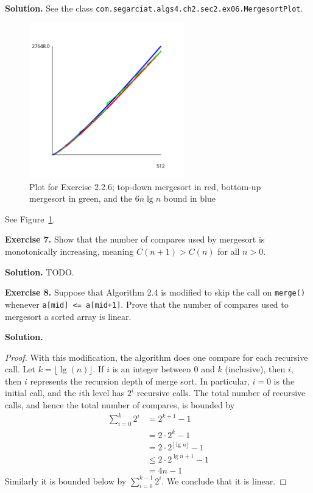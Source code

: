 \documentclass[12pt, a4paper]{article}
\newenvironment{ex}[2][Exercise]
{\par\medskip\noindent \textbf{#1 #2.}}
{\medskip}
\newenvironment{sol}[1][Solution]
{\par\medskip\noindent \textbf{#1.} }
{\medskip}
\begin{document}
	\begin{sol}
		See the class \texttt{com.segarciat.algs4.ch2.sec2.ex06.MergesortPlot}.
		\begin{figure}
			\centering
			\includegraphics[width=0.6\textwidth]{mergesort-array-access-cost-plot}
			\caption{Plot for Exercise 2.2.6; top-down mergesort in red, bottom-up mergesort in green,
			and the $6n\lg n$ bound in blue}
			\label{ex:6}
		\end{figure}
		See Figure~\ref{ex:6}.
	\end{sol}
	\begin{ex}{7}
		Show that the number of compares used by mergesort is monotonically increasing,
		meaning $C(n+1)>C(n)$ for all $n>0$.
	\end{ex}
	\begin{sol}
		TODO.
	\end{sol}
	\begin{ex}{8}
		Suppose that Algorithm 2.4 is modified to skip the call on \texttt{merge()} whenever
		\texttt{a[mid] <= a[mid+1]}. Prove that the number of compares used to mergesort
		a sorted array is linear.
	\end{ex}
	\begin{sol}
		\begin{proof}
			With this modification, the algorithm does one compare for each recursive call.
			Let $k=\lfloor \lg(n) \rfloor$. If $i$ is an integer between $0$ and $k$ (inclusive),
			then $i$, then $i$ represents the recursion depth of merge sort. In particular,
			$i=0$ is the initial call, and the $i$th level has $2^i$ recursive calls.
			The total number of recursive calls, and hence the total number of compares, is
			bounded by
			\begin{align*}
				\sum_{i=0}^{k}2^i&=2^{k+1}-1\\
				&=2\cdot 2^k-1\\
				&=2\cdot 2^{\lfloor \lg n\rfloor } -1\\
				&\leq 2\cdot 2^{\lg n +1}- 1\\
				&=4n-1
			\end{align*}
			Similarly it is bounded below by $\sum_{i=0}^{k-1}2^i$. We conclude that it is linear.
		\end{proof}
	\end{sol}
\end{document}
